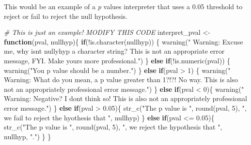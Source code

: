 \documentclass[
  openany]{book}
\newenvironment{Shaded}{\begin{snugshade}}{\end{snugshade}}
\newcommand{\CommentTok}[1]{\textcolor[rgb]{0.56,0.35,0.01}{\textit{#1}}}
\newcommand{\ControlFlowTok}[1]{\textcolor[rgb]{0.13,0.29,0.53}{\textbf{#1}}}
\newcommand{\DecValTok}[1]{\textcolor[rgb]{0.00,0.00,0.81}{#1}}
\newcommand{\FloatTok}[1]{\textcolor[rgb]{0.00,0.00,0.81}{#1}}
\newcommand{\FunctionTok}[1]{\textcolor[rgb]{0.00,0.00,0.00}{#1}}
\newcommand{\NormalTok}[1]{#1}
\newcommand{\OtherTok}[1]{\textcolor[rgb]{0.56,0.35,0.01}{#1}}
\newcommand{\SpecialCharTok}[1]{\textcolor[rgb]{0.00,0.00,0.00}{#1}}
\newcommand{\StringTok}[1]{\textcolor[rgb]{0.31,0.60,0.02}{#1}}
\begin{document}
This would be an example of a \emph{p} values interpreter that uses a 0.05 threshold to reject or fail to reject the null hypothesis.

\begin{Shaded}
\begin{Highlighting}[]
\CommentTok{\# This is just an example! MODIFY THIS CODE}
\NormalTok{interpret\_pval }\OtherTok{\textless{}{-}} \ControlFlowTok{function}\NormalTok{(pval, nullhyp)\{}
  \ControlFlowTok{if}\NormalTok{(}\SpecialCharTok{!}\FunctionTok{is.character}\NormalTok{(nullhyp)) \{}
    \FunctionTok{warning}\NormalTok{(}\StringTok{"}
\StringTok{            Warning: Excuse me, why isn\textquotesingle{}t nullyhyp a character string? }
\StringTok{            This is not an appropriate error message, FYI. }
\StringTok{            Make yours more professional."}\NormalTok{)}
\NormalTok{  \} }\ControlFlowTok{else} \ControlFlowTok{if}\NormalTok{(}\SpecialCharTok{!}\FunctionTok{is.numeric}\NormalTok{(pval)) \{}
    \FunctionTok{warning}\NormalTok{(}\StringTok{"You p value should be a number."}\NormalTok{)}
\NormalTok{  \}  }\ControlFlowTok{else} \ControlFlowTok{if}\NormalTok{(pval }\SpecialCharTok{\textgreater{}} \DecValTok{1}\NormalTok{) \{}
    \FunctionTok{warning}\NormalTok{(}\StringTok{"}
\StringTok{            Warning: What do you mean, a p value greater than 1?!?! }
\StringTok{            No way. }
\StringTok{            This is also not an appropriately professional error message."}\NormalTok{)}
\NormalTok{  \} }\ControlFlowTok{else} \ControlFlowTok{if}\NormalTok{(pval }\SpecialCharTok{\textless{}} \DecValTok{0}\NormalTok{)\{}
    \FunctionTok{warning}\NormalTok{(}\StringTok{"}
\StringTok{            Warning: Negative? I don\textquotesingle{}t think so! }
\StringTok{            This is also not an appropriately professional error message."}\NormalTok{)}
\NormalTok{  \} }\ControlFlowTok{else} \ControlFlowTok{if}\NormalTok{(pval }\SpecialCharTok{\textgreater{}} \FloatTok{0.05}\NormalTok{)\{}
    \FunctionTok{str\_c}\NormalTok{(}\StringTok{"The p value is "}\NormalTok{, }\FunctionTok{round}\NormalTok{(pval, }\DecValTok{5}\NormalTok{), }
                \StringTok{", we fail to reject the hyothesis that "}\NormalTok{, nullhyp)}
\NormalTok{  \} }\ControlFlowTok{else} \ControlFlowTok{if}\NormalTok{(pval }\SpecialCharTok{\textless{}=} \FloatTok{0.05}\NormalTok{)\{}
    \FunctionTok{str\_c}\NormalTok{(}\StringTok{"The p value is "}\NormalTok{, }\FunctionTok{round}\NormalTok{(pval, }\DecValTok{5}\NormalTok{), }
                \StringTok{", we reject the hypothesis that "}\NormalTok{, nullhyp, }\StringTok{"."}\NormalTok{)}
\NormalTok{  \}}
\NormalTok{\}}


\end{Highlighting}
\end{Shaded}
\end{document}
